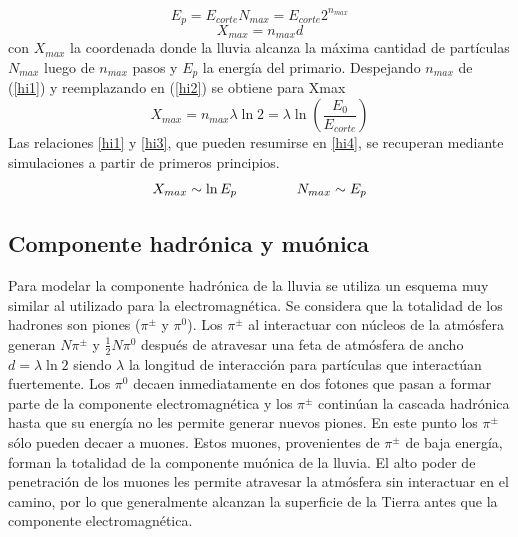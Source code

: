 %
\begin{equation}
\label{hi1}
E_p = E_{corte} N_{max} = E_{corte} 2^{n_{max}}
\end{equation}
%
\begin{equation}
\label{hi2}
X_{max}=n_{max} d
\end{equation}
%
con $X_{max}$ la coordenada donde la lluvia alcanza la máxima cantidad de partículas $N_{max}$ luego de $n_{max}$ pasos y $E_p$ la energía del primario.
Despejando $n_{max}$ de (\ref{hi1}) y reemplazando en (\ref{hi2}) se obtiene para Xmax
%
\begin{equation}
\label{hi3}
X_{max} = n_{max} \lambda \ln2=\lambda \ln\left(\frac{E_{0}}{E_{corte}}\right)
\end{equation}
%
Las relaciones \ref{hi1} y \ref{hi3}, que pueden resumirse en \ref{hi4}, se recuperan mediante simulaciones a partir de primeros principios.
%
\begin{equation}
\label{hi4}
X_{max} \sim \ln E_{p}
\hspace*{15mm}
N_{max} \sim E_p
\end{equation}
%

\subsection{Componente hadrónica y muónica}
Para modelar la componente hadrónica de la lluvia se utiliza un esquema muy similar al utilizado para la electromagnética.
Se considera que la totalidad de los hadrones son piones ($\pi^{\pm}$ y $\pi^{0}$). Los $\pi^{\pm}$ al interactuar con n\'ucleos de la atm\'osfera generan $N \pi^{\pm}$ y $\frac{1}{2}N \pi^{0}$ después de atravesar una feta de atmósfera de ancho $d=\lambda \ln2$ siendo $\lambda$ la longitud de interacción para partículas que interactúan fuertemente.
Los $\pi^{0}$ decaen inmediatamente en dos fotones que pasan a formar parte de la componente electromagnética y los $\pi^{\pm}$ continúan la cascada hadrónica hasta que su energía no les permite generar nuevos piones.
En este punto los $\pi^{\pm}$ s\'olo pueden decaer a muones.
Estos muones, provenientes de $\pi^{\pm}$ de baja energía, forman la totalidad de la componente muónica de la lluvia.
El alto poder de penetración de los muones les permite atravesar la atmósfera sin interactuar en el camino, por lo que generalmente alcanzan la superficie de la Tierra antes que la componente electromagnética.

